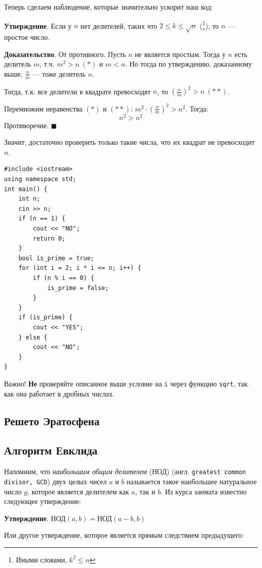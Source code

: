 \documentclass{article}
\newcommand{\stat}[1]{\textbf{Утверждение}. #1}
\newcommand{\important}[1]{
	\begin{sectionenv}[red!30!white]{Важно!}
		#1
	\end{sectionenv}
}
\begin{document}
	Теперь сделаем наблюдение, которые значительно ускорит наш код:
	
	\stat{Если у $n$ нет делителей, таких что $2 \le k \le \sqrt{n}$ (\footnote{Иными словами, $k^2 \le n$}), то $n$ --- простое число.}
	
	\textbf{Доказательство}. От противного. Пусть $n$ не является простым. Тогда у $n$ есть делитель $m$, т.ч. $m^2 > n\ (*)$ и $m < n$. Но тогда по утверждению, доказанному выше, $\frac{n}{m}$ --- тоже делитель $n$.
	
	Тогда, т.к. все делители в квадрате превосходят $n$, то $\left(\frac{n}{m}\right)^2 > n\ (**)$.
	
	Перемножим неравенства $(*)$ и $(**)$: $m^2 \cdot \left(\frac{n}{m}\right)^2 > n^2$. Тогда: $$ n^2 > n^2 $$ Противоречие. $\blacksquare$
	
	Значит, достаточно проверить только такие числа, что их квадрат не превосходит $n$.
	
	\begin{lstlisting}
#include <iostream>
using namespace std;
int main() {
	int n;
	cin >> n;
	if (n == 1) {
		cout << "NO";
		return 0;
	}
	bool is_prime = true;
	for (int i = 2; i * i <= n; i++) {
		if (n % i == 0) {
			is_prime = false;
		}
	}
	if (is_prime) {
		cout << "YES";
	} else {
		cout << "NO";
	}
}
	\end{lstlisting}
	
	\important{\textbf{Не} проверяйте описанное выше условие на \texttt{i} через функцию \texttt{sqrt}, так как она работает в дробных числах.}
	
	\subsection{Решето Эратосфена}
	
	\subsection{Алгоритм Евклида}
	
	Напомним, что \textit{наибольшим общим делителем} (НОД) (англ. \texttt{greatest common divisor, GCD}) двух целых чисел $a$ и $b$ называется такое наибольшее натуральное число $g$, которое является делителем как $a$, так и $b$. Из курса занмата известно следующее утверждение:
	
	\stat{$\text{НОД}(a, b) = \text{НОД}(a - b, b)$}
	
	Или другое утверждение, которое является прямым следствием предыдущего:
	
\end{document}
